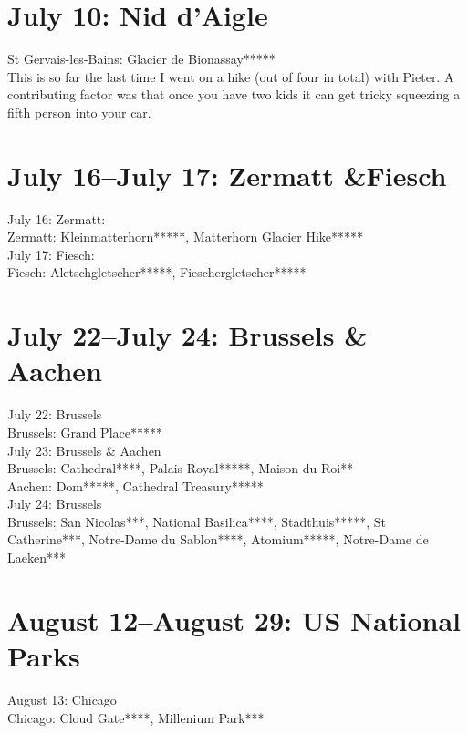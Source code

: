 \section{July 10: Nid d'Aigle}
\label{Niddaigle2016}

St Gervais-les-Bains: Glacier de Bionassay*****\\

This is so far the last time I went on a hike (out of four in total) with Pieter. A contributing factor was that once you have two kids it can get tricky squeezing a fifth person into your car.\\

\section{July 16--July 17: Zermatt \&Fiesch}
\label{ZermattFiesch2016}

July 16: Zermatt:\\
Zermatt: Kleinmatterhorn*****, Matterhorn Glacier Hike*****\\

July 17: Fiesch:\\
Fiesch: Aletschgletscher*****, Fieschergletscher*****

\section{July 22--July 24: Brussels \& Aachen}
\label{Brussels2016}

July 22: Brussels\\
Brussels: Grand Place*****\\

July 23: Brussels \& Aachen\\
Brussels: Cathedral****, Palais Royal*****, Maison du Roi**\\
Aachen: Dom*****, Cathedral Treasury*****\\

July 24: Brussels\\
Brussels: San Nicolas***, National Basilica****, Stadthuis*****, St Catherine***, Notre-Dame du Sablon****,  Atomium*****, Notre-Dame de Laeken***

\section{August 12--August 29: US National Parks}
\label{US2016}

August 13: Chicago\\
Chicago: Cloud Gate****, Millenium Park***\\

